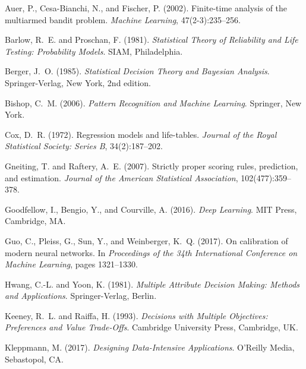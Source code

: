 \documentclass[12pt,a4paper]{article}
\begin{document}
\begin{thebibliography}{99}

Auer, P., Cesa-Bianchi, N., and Fischer, P. (2002).
\newblock Finite-time analysis of the multiarmed bandit problem.
\newblock \emph{Machine Learning}, 47(2-3):235--256.

Barlow, R.~E. and Proschan, F. (1981).
\newblock \emph{Statistical Theory of Reliability and Life Testing: Probability Models}.
\newblock SIAM, Philadelphia.

Berger, J.~O. (1985).
\newblock \emph{Statistical Decision Theory and Bayesian Analysis}.
\newblock Springer-Verlag, New York, 2nd edition.

Bishop, C.~M. (2006).
\newblock \emph{Pattern Recognition and Machine Learning}.
\newblock Springer, New York.

Cox, D.~R. (1972).
\newblock Regression models and life-tables.
\newblock \emph{Journal of the Royal Statistical Society: Series B}, 34(2):187--202.

Gneiting, T. and Raftery, A.~E. (2007).
\newblock Strictly proper scoring rules, prediction, and estimation.
\newblock \emph{Journal of the American Statistical Association}, 102(477):359--378.

Goodfellow, I., Bengio, Y., and Courville, A. (2016).
\newblock \emph{Deep Learning}.
\newblock MIT Press, Cambridge, MA.

Guo, C., Pleiss, G., Sun, Y., and Weinberger, K.~Q. (2017).
\newblock On calibration of modern neural networks.
\newblock In \emph{Proceedings of the 34th International Conference on Machine Learning}, pages 1321--1330.

Hwang, C.-L. and Yoon, K. (1981).
\newblock \emph{Multiple Attribute Decision Making: Methods and Applications}.
\newblock Springer-Verlag, Berlin.

Keeney, R.~L. and Raiffa, H. (1993).
\newblock \emph{Decisions with Multiple Objectives: Preferences and Value Trade-Offs}.
\newblock Cambridge University Press, Cambridge, UK.

Kleppmann, M. (2017).
\newblock \emph{Designing Data-Intensive Applications}.
\newblock O'Reilly Media, Sebastopol, CA.


\end{thebibliography}
\end{document}
